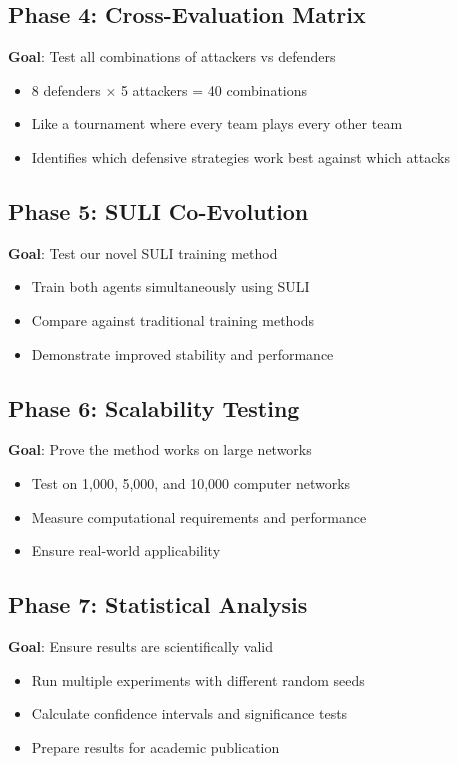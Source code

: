 \documentclass[11pt]{article}
\begin{document}
\subsection{Phase 4: Cross-Evaluation Matrix}
\begin{intuition}
\textbf{Goal}: Test all combinations of attackers vs defenders
\begin{itemize}
\item 8 defenders × 5 attackers = 40 combinations
\item Like a tournament where every team plays every other team
\item Identifies which defensive strategies work best against which attacks
\end{itemize}
\end{intuition}

\subsection{Phase 5: SULI Co-Evolution}
\begin{intuition}
\textbf{Goal}: Test our novel SULI training method
\begin{itemize}
\item Train both agents simultaneously using SULI
\item Compare against traditional training methods
\item Demonstrate improved stability and performance
\end{itemize}
\end{intuition}

\subsection{Phase 6: Scalability Testing}
\begin{intuition}
\textbf{Goal}: Prove the method works on large networks
\begin{itemize}
\item Test on 1,000, 5,000, and 10,000 computer networks
\item Measure computational requirements and performance
\item Ensure real-world applicability
\end{itemize}
\end{intuition}

\subsection{Phase 7: Statistical Analysis}
\begin{intuition}
\textbf{Goal}: Ensure results are scientifically valid
\begin{itemize}
\item Run multiple experiments with different random seeds
\item Calculate confidence intervals and significance tests
\item Prepare results for academic publication
\end{itemize}
\end{intuition}
\end{document}
